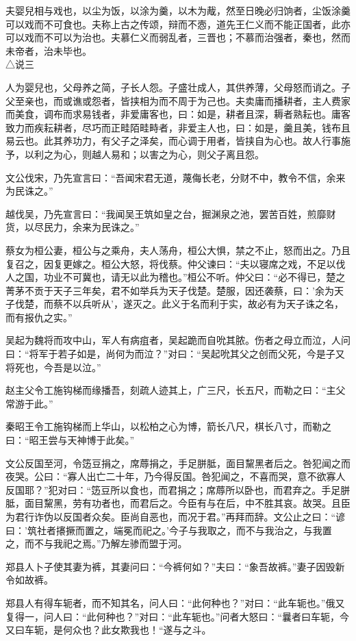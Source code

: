 \documentclass[]{article}
\begin{document}
夫婴兒相与戏也，以尘为饭，以涂为羹，以木为胾，然至日晚必归饷者，尘饭涂羹可以戏而不可食也。夫称上古之传颂，辩而不悫，道先王仁义而不能正国者，此亦可以戏而不可以为治也。夫慕仁义而弱乱者，三晋也；不慕而治强者，秦也，然而未帝者，治未毕也。
\\
△说三

人为婴兒也，父母养之简，子长人怨。子盛壮成人，其供养薄，父母怒而诮之。子父至亲也，而或谯或怨者，皆挟相为而不周于为己也。夫卖庸而播耕者，主人费家而美食，调布而求易钱者，非爱庸客也，曰：如是，耕者且深，耨者熟耘也。庸客致力而疾耘耕者，尽巧而正畦陌畦畤者，非爱主人也，曰：如是，羹且美，钱布且易云也。此其养功力，有父子之泽矣，而心调于用者，皆挟自为心也。故人行事施予，以利之为心，则越人易和；以害之为心，则父子离且怨。

文公伐宋，乃先宣言曰：``吾闻宋君无道，蔑侮长老，分财不中，教令不信，余来为民诛之。''

越伐吴，乃先宣言曰：``我闻吴王筑如皇之台，掘渊泉之池，罢苦百姓，煎靡财货，以尽民力，余来为民诛之。''

蔡女为桓公妻，桓公与之乘舟，夫人荡舟，桓公大惧，禁之不止，怒而出之。乃且复召之，因复更嫁之。桓公大怒，将伐蔡。仲父谏曰：``夫以寝席之戏，不足以伐人之国，功业不可冀也，请无以此为稽也。''桓公不听。仲父曰：``必不得已，楚之菁茅不贡于天子三年矣，君不如举兵为天子伐楚。楚服，因还袭蔡，曰：'余为天子伐楚，而蔡不以兵听从'，遂灭之。此义于名而利于实，故必有为天子诛之名，而有报仇之实。''

吴起为魏将而攻中山，军人有病疽者，吴起跪而自吮其脓。伤者之母立而泣，人问曰：``将军于若子如是，尚何为而泣？''对曰：``吴起吮其父之创而父死，今是子又将死也，今吾是以泣。''

赵主父令工施钩梯而缘播吾，刻疏人迹其上，广三尺，长五尺，而勒之曰：``主父常游于此。''

秦昭王令工施钩梯而上华山，以松柏之心为博，箭长八尺，棋长八寸，而勒之曰：``昭王尝与天神博于此矣。''

文公反国至河，令笾豆捐之，席蓐捐之，手足胼胝，面目黧黑者后之。咎犯闻之而夜哭。公曰：``寡人出亡二十年，乃今得反国。咎犯闻之，不喜而哭，意不欲寡人反国耶？''犯对曰：``笾豆所以食也，而君捐之；席蓐所以卧也，而君弃之。手足胼胝，面目黧黑，劳有功者也，而君后之。今臣有与在后，中不胜其哀。故哭。且臣为君行诈伪以反国者众矣。臣尚自恶也，而况于君。''再拜而辞。文公止之曰：``谚曰：'筑社者攐撅而置之，端冕而祀之。'今子与我取之，而不与我治之，与我置之，而不与我祀之焉。''乃解左骖而盟于河。

郑县人卜子使其妻为裤，其妻问曰：``今裤何如？''夫曰：``象吾故裤。''妻子因毁新令如故裤。

郑县人有得车轭者，而不知其名，问人曰：``此何种也？''对曰：``此车轭也。''俄又复得一，问人曰：``此何种也？''对曰：``此车轭也。''问者大怒曰：``曩者曰车轭，今又曰车轭，是何众也？此女欺我也！``遂与之斗。
\end{document}
